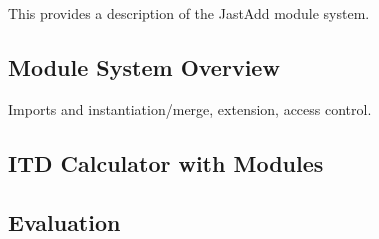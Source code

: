 This provides a description of the JastAdd module system.

\subsection{Module System Overview}

Imports and instantiation/merge, extension, access control.

\subsection{ITD Calculator with Modules}

\subsection{Evaluation}

